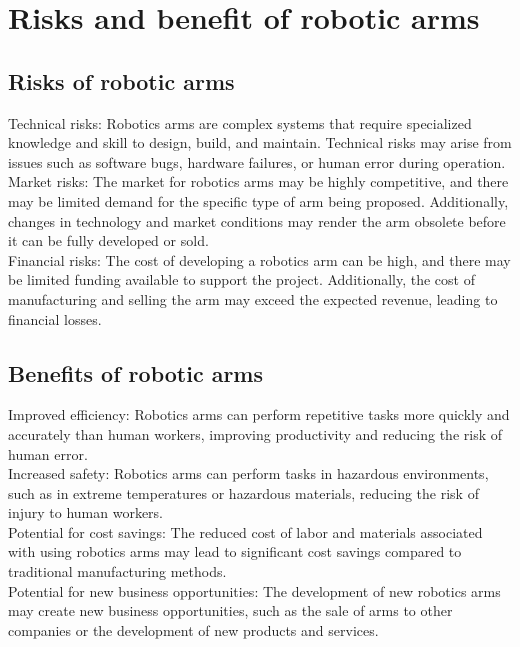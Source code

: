 \section{Risks and benefit of robotic arms}
\subsection{Risks of robotic arms}
Technical risks: Robotics arms are complex systems that require specialized knowledge and skill to design, build, and maintain. Technical risks may arise from issues such as software bugs, hardware failures, or human error during operation.\\
Market risks: The market for robotics arms may be highly competitive, and there may be limited demand for the specific type of arm being proposed. Additionally, changes in technology and market conditions may render the arm obsolete before it can be fully developed or sold.\\
Financial risks: The cost of developing a robotics arm can be high, and there may be limited funding available to support the project. Additionally, the cost of manufacturing and selling the arm may exceed the expected revenue, leading to financial losses.
\subsection{Benefits of robotic arms}
Improved efficiency: Robotics arms can perform repetitive tasks more quickly and accurately than human workers, improving productivity and reducing the risk of human error.\\
Increased safety: Robotics arms can perform tasks in hazardous environments, such as in extreme temperatures or hazardous materials, reducing the risk of injury to human workers.\\
Potential for cost savings: The reduced cost of labor and materials associated with using robotics arms may lead to significant cost savings compared to traditional manufacturing methods.\\
Potential for new business opportunities: The development of new robotics arms may create new business opportunities, such as the sale of arms to other companies or the development of new products and services.\\